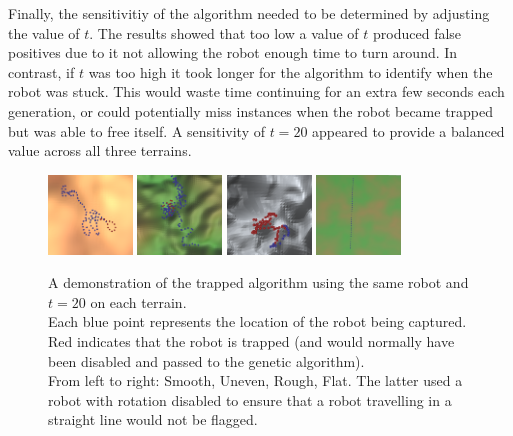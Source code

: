\documentclass{article}
\begin{document}
Finally, the sensitivitiy of the algorithm needed to be determined by adjusting the value of $t$. The results showed that too low a value of $t$ produced false positives due to it not allowing the robot enough time to turn around. In contrast, if $t$ was too high it took longer for the algorithm to identify when the robot was stuck. This would waste time continuing for an extra few seconds each generation, or could potentially miss instances when the robot became trapped but was able to free itself. A sensitivity of $t=20$ appeared to provide a balanced value across all three terrains.

\begin{figure}[H]
\centering
\includegraphics[width=0.2\textwidth]{trappedSmooth}
\includegraphics[width=0.2\textwidth]{trappedUneven}
\includegraphics[width=0.2\textwidth]{trappedRough}
\includegraphics[width=0.2\textwidth]{trappedFlat}
\caption{A demonstration of the trapped algorithm using the same robot and $t=20$ on each terrain.\\
Each blue point represents the location of the robot being captured. Red indicates that the robot is trapped (and would normally have been disabled and passed to the genetic algorithm).\\ 
From left to right: Smooth, Uneven, Rough, Flat. The latter used a robot with rotation disabled to ensure that a robot travelling in a straight line would not be flagged.}
\end{figure}
\end{document}
